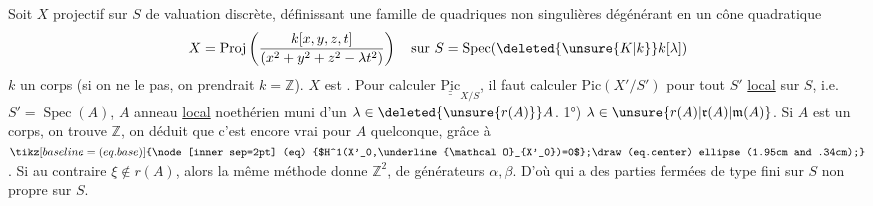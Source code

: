 Soit $X$  projectif sur $S$ de valuation discrète, définissant une famille de quadriques non singulières dégénérant en un cône quadratique
\[
X=\operatorname{Proj}\left(\frac{k[x,y,z,t]}{(x^2+y^2+z^2-\lambda t^2)}\right)\quad\text{sur }S=\operatorname{Spec}(\deleted{\unsure{K|k}}k[\lambda])
\]
 $k$ un corps (si on ne le  pas, on prendrait $k=\mathbb Z$). $X$ est  .  Pour calculer $\underline{\underline{\mathrm{Pic}}}_{X/S}$, il faut calculer $\mathrm{Pic}(X'/S')$ pour tout $S'$ \uline{local} sur $S$, i.e. $S'=\operatorname{Spec}(A)$, $A$ anneau \uline{local} noethérien muni d'un $\lambda\in\deleted{\unsure{r(A)}}A$. 1°) $\lambda\in\unsure{r(A)|\mathfrak r(A)|\mathfrak m(A)}$. Si $A$ est un corps, on trouve $\mathbb Z$,  on déduit que c'est encore vrai pour $A$ quelconque, grâce à $\tikz[baseline=(eq.base)]{\node[inner sep=2pt] (eq) {$H^1(X'_0,\underline{\mathcal O}_{X'_0})=0$};\draw (eq.center) ellipse (1.95cm and .34cm);}$.
 Si au contraire $\xi\notin r(A)$, alors la même méthode donne  $\mathbb Z^2$, de générateurs $\alpha,\beta$. D'où   qui a des parties fermées de type fini sur $S$ non propre sur $S$.
